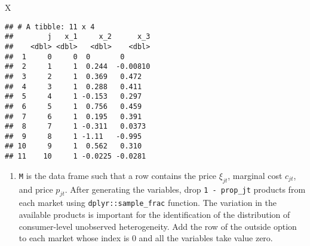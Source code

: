 \documentclass[
]{book}
\newenvironment{Shaded}{\begin{snugshade}}{\end{snugshade}}
\newcommand{\NormalTok}[1]{#1}
\providecommand{\tightlist}{%
  \setlength{\itemsep}{0pt}\setlength{\parskip}{0pt}}
\begin{document}
\begin{Shaded}
\begin{Highlighting}[]
\NormalTok{X}
\end{Highlighting}
\end{Shaded}

\begin{verbatim}
## # A tibble: 11 x 4
##        j   x_1     x_2      x_3
##    <dbl> <dbl>   <dbl>    <dbl>
##  1     0     0  0       0      
##  2     1     1  0.244  -0.00810
##  3     2     1  0.369   0.472  
##  4     3     1  0.288   0.411  
##  5     4     1 -0.153   0.297  
##  6     5     1  0.756   0.459  
##  7     6     1  0.195   0.391  
##  8     7     1 -0.311   0.0373 
##  9     8     1 -1.11   -0.995  
## 10     9     1  0.562   0.310  
## 11    10     1 -0.0225 -0.0281
\end{verbatim}

\begin{enumerate}
\def\labelenumi{\arabic{enumi}.}
\setcounter{enumi}{2}
\tightlist
\item
  \texttt{M} is the data frame such that a row contains the price \(\xi_{jt}\), marginal cost \(c_{jt}\), and price \(p_{jt}\). After generating the variables, drop \texttt{1\ -\ prop\_jt} products from each market using \texttt{dplyr::sample\_frac} function. The variation in the available products is important for the identification of the distribution of consumer-level unobserved heterogeneity. Add the row of the outside option to each market whose index is \(0\) and all the variables take value zero.
\end{enumerate}
\end{document}
